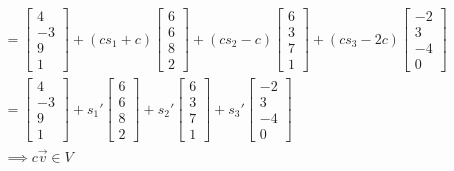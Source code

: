 \documentclass[12pt, a4paper]{article}
\begin{document}
\begin{enumerate}[Q\arabic*.]
\begin{align*}
      &= \begin{bmatrix}4\\-3\\9\\1\end{bmatrix} + (cs_1+c)\begin{bmatrix}6\\6\\8\\2\end{bmatrix} + (cs_2-c)\begin{bmatrix}6\\3\\7\\1\end{bmatrix} + (cs_3-2c)\begin{bmatrix}-2\\3\\-4\\0\end{bmatrix}\\
      &= \begin{bmatrix}4\\-3\\9\\1\end{bmatrix} + s_1'\begin{bmatrix}6\\6\\8\\2\end{bmatrix} + s_2'\begin{bmatrix}6\\3\\7\\1\end{bmatrix} + s_3'\begin{bmatrix}-2\\3\\-4\\0\end{bmatrix}\tag*{($\RR$ closed over addition/multiplication)}\\
      &\implies c \vec{v} \in V
    \end{align*}


\end{enumerate}
\end{document}
